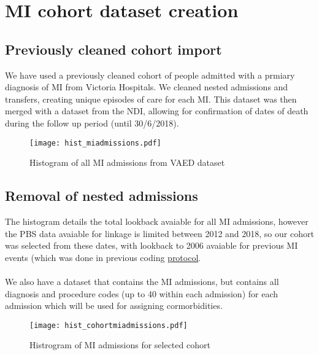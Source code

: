 \documentclass[11pt]{article}
\begin{document}
\pagebreak
		
\section{MI cohort dataset creation}
\subsection{Previously cleaned cohort import}
We have used a previously cleaned cohort of people admitted with a prmiary diagnosis of MI from Victoria Hospitals. We cleaned nested admissions and transfers, creating unique episodes of care for each MI. This dataset was then merged with a dataset from the NDI, allowing for confirmation of dates of death during the follow up period (until 30/6/2018). 

\color{violet}
\begin{stlog}\end{stlog}
\color{black}
\begin{figure} [h]
	\centering
	\texttt{[image: hist\_miadmissions.pdf]}
	\caption{Histogram of all MI admissions from VAED dataset}
	\label{hist_miadmissions}
\end{figure}

\subsection{Removal of nested admissions}
\color{violet}
\color{black}
The histogram details the total lookback avaiable for all MI admissions, however the PBS data avaiable for linkage is limited between 2012 and 2018, so our cohort was selected from these dates, with lookback to 2006 avaiable for previous MI events (which was done in previous coding \color{blue} \href{https://github.com/cardiopharmnerd/medsremote}{protocol}. \\~\\
\color{black} We also have a dataset that contains the MI admissions, but contains all diagnosis and procedure codes (up to 40 within each admission) for each admission which will be used for assigning cormorbidities. 
\color{violet}
\begin{stlog}\end{stlog}
\color{black}
\begin{figure} [h]
	\centering
	\texttt{[image: hist\_cohortmiadmissions.pdf]}
	\caption{Histrogram of MI admissions for selected cohort}
	\label{hist_cohortmiadmissions}
\end{figure}
\end{document}
